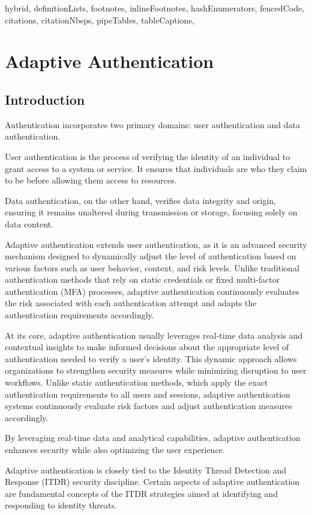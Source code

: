 \documentclass[
  digital,     %
  oneside,     %
  nosansbold,  %
  nocolorbold, %
  lof,         %
  lot,         %
]{fithesis4}
\begin{document}
\shorthandoff{-}
\begin{markdown*}{%
  hybrid,
  definitionLists,
  footnotes,
  inlineFootnotes,
  hashEnumerators,
  fencedCode,
  citations,
  citationNbsps,
  pipeTables,
  tableCaptions,
}
\chapter{Adaptive Authentication}
\section{Introduction}
Authentication incorporates two primary domains: user authentication and data authentication. 

User authentication is the process of verifying the identity of an individual to grant access to a system or service.
It ensures that individuals are who they claim to be before allowing them access to resources.

Data authentication, on the other hand, verifies data integrity and origin, ensuring it remains unaltered during transmission or storage, focusing solely on data content.

Adaptive authentication extends user authentication, as it is an advanced security mechanism designed to dynamically adjust the level of authentication based on various factors such as user behavior, context, and risk levels.
Unlike traditional authentication methods that rely on static credentials or fixed multi-factor authentication (MFA) processes, adaptive authentication continuously evaluates the risk associated with each authentication attempt and adapts the authentication requirements accordingly.

At its core, adaptive authentication usually leverages real-time data analysis and contextual insights to make informed decisions about the appropriate level of authentication needed to verify a user's identity.
This dynamic approach allows organizations to strengthen security measures while minimizing disruption to user workflows.
Unlike static authentication methods, which apply the exact authentication requirements to all users and sessions, adaptive authentication systems continuously evaluate risk factors and adjust authentication measures accordingly.

By leveraging real-time data and analytical capabilities, adaptive authentication enhances security while also optimizing the user experience.\cite{intro-logintc}

Adaptive authentication is closely tied to the Identity Thread Detection and Response (ITDR) security discipline.
Certain aspects of adaptive authentication are fundamental concepts of the ITDR strategies aimed at identifying and responding to identity threats.
\newpage


\end{markdown*}
\end{document}
